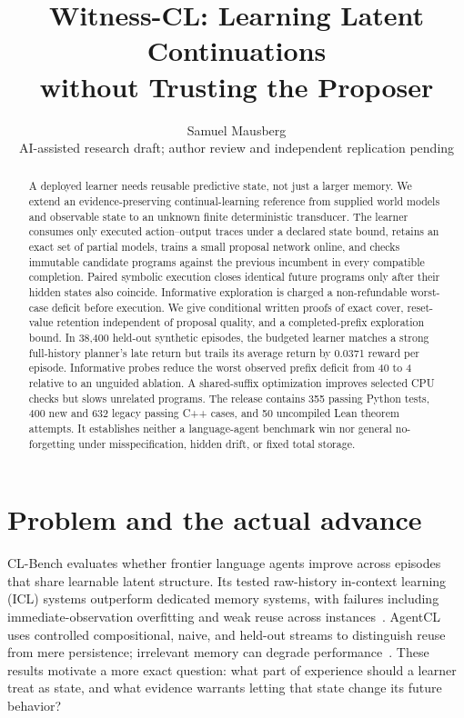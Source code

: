 \documentclass[10pt,twocolumn]{article}
\title{\vspace{-1.2em}\textbf{Witness-CL: Learning Latent Continuations\\without Trusting the Proposer}}
\author{Samuel Mausberg\\\small AI-assisted research draft; author review and independent replication pending}
\date{}
\begin{document}
\raggedbottom
\maketitle
\begin{abstract}
A deployed learner needs reusable predictive state, not just a larger memory. We
extend an evidence-preserving continual-learning reference from supplied world
models and observable state to an unknown finite deterministic transducer. The
learner consumes only executed action--output traces under a declared state bound,
retains an exact set of partial models, trains a small proposal network online,
and checks immutable candidate programs against the previous incumbent in every
compatible completion. Paired symbolic execution closes identical future programs
only after their hidden states also coincide. Informative exploration is charged
a non-refundable worst-case deficit before execution. We give conditional written
proofs of exact cover, reset-value retention independent of proposal quality, and
a completed-prefix exploration bound. In 38,400 held-out synthetic episodes, the
budgeted learner matches a strong full-history planner's late return but trails
its average return by 0.0371 reward per episode. Informative probes reduce the
worst observed prefix deficit from 40 to 4 relative to an unguided ablation.
A shared-suffix optimization improves selected CPU checks but slows unrelated
programs. The release contains 355 passing Python tests, 400 new and 632 legacy
passing C++ cases, and 50 uncompiled Lean theorem attempts. It establishes neither
a language-agent benchmark win nor general no-forgetting under misspecification,
hidden drift, or fixed total storage.
\end{abstract}

\section{Problem and the actual advance}
CL-Bench evaluates whether frontier language agents improve across episodes that
share learnable latent structure. Its tested raw-history in-context learning
(ICL) systems outperform dedicated memory systems, with failures including
immediate-observation overfitting and weak reuse across instances~\cite{clbench}.
AgentCL uses controlled compositional, naive, and held-out streams to distinguish
reuse from mere persistence; irrelevant memory can degrade performance~\cite{agentcl}.
These results motivate a more exact question: what part of experience should a
learner treat as state, and what evidence warrants letting that state change its
future behavior?
\end{document}
